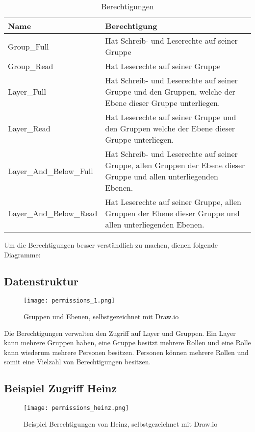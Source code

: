 \begin{table}[h!]
  \begin{tabular}{|L{0.3\textwidth}|L{0.8\textwidth}|}
      \color{white} Name & \color{white} Berechtigung \\ [12pt]
      \hline
      Group\_Full & Hat Schreib- und Leserechte auf seiner Gruppe \\
      \hline
      Group\_Read & Hat Leserechte auf seiner Gruppe  \\
      \hline
      Layer\_Full & Hat Schreib- und Leserechte auf seiner Gruppe und den Gruppen, welche der Ebene dieser Gruppe unterliegen. \\
      \hline
      Layer\_Read & Hat Leserechte auf seiner Gruppe und den Gruppen welche der Ebene dieser Gruppe unterliegen. \\
      \hline
      Layer\_And\_Below\_Full & Hat Schreib- und Leserechte auf seiner Gruppe, allen Gruppen der Ebene dieser Gruppe und allen unterliegenden Ebenen. \\
      \hline
      Layer\_And\_Below\_Read & Hat Leserechte auf seiner Gruppe, allen Gruppen der Ebene dieser Gruppe und allen unterliegenden Ebenen. \\
      \hline
    \end{tabular}
    \caption{Berechtigungen}
\end{table}

\newpage

Um die Berechtigungen besser verständlich zu machen, dienen folgende Diagramme:


\subsection{Datenstruktur}
\begin{figure}[h]
  \centering
  \texttt{[image: permissions\_1.png]}
  \caption{Gruppen und Ebenen, selbstgezeichnet mit Draw.io}
\end{figure}

Die Berechtigungen verwalten den Zugriff auf Layer und Gruppen. Ein Layer kann mehrere Gruppen haben,
eine Gruppe besitzt mehrere Rollen und eine Rolle kann wiederum mehrere Personen besitzen. Personen können
mehrere Rollen und somit eine Vielzahl von Berechtigungen besitzen.

\newpage

\subsection{Beispiel Zugriff Heinz}
\begin{figure}[h]
  \centering
  \texttt{[image: permissions\_heinz.png]}
  \caption{Beispiel Berechtigungen von Heinz, selbstgezeichnet mit Draw.io}
\end{figure}

